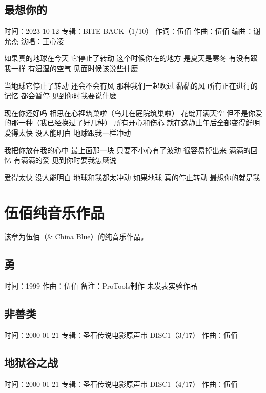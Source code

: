 \documentclass[UTF8,a4paper,oneside,twocolumn,12pt]{ctexbook}
\newcommand{\infopair}[2]{\textbullet #1：#2}
\newcommand{\zc}[1][伍佰]{\infopair{作词}{#1}}
\newcommand{\zq}[1][伍佰]{\infopair{作曲}{#1}}
\newcommand{\bq}[1][伍佰]{\infopair{编曲}{#1}}
\newcommand{\zj}[1]{\infopair{专辑}{#1}}
\newcommand{\sj}[1]{\infopair{时间}{#1}}
\newcommand{\bz}[1]{\infopair{备注}{#1}}
\newenvironment{info}{\begin{flushleft}\kaishu
	}
	{\end{flushleft}\normalsize\yahei\par}
\newenvironment{lyric}{
	}
{}
\begin{document}
\section{最想你的}
\begin{info}
	\sj{2023-10-12}
	\zj{BITE BACK（1/10）}
	\zc
	\zq
	\bq[谢允杰]
	\infopair{演唱}{王心凌}
\end{info}
\begin{lyric}%
	如果真的地球在今天 它停止了转动
	这个时候你在的地方 是夏天是寒冬
	有没有跟我一样 有湿湿的空气
	见面时候该说些什麽

	当地球它停止了转动 还会不会有风
	那种我们一起吹过 黏黏的风
	所有正在进行的记忆 都会暂停
	见到你时我要说什麽

	现在你还好吗 相思在心裡筑巢啦（鸟儿在庭院筑巢啦）
	花绽开满天空 但不是你爱的那一种（我已经换过了好几种）
	所有开心和伤心
	就在这静止午后全部变得鲜明
	爱得太快 没人能明白
	地球跟我一样冲动

	我把你放在我的心中 最上面那一块
	只要不小心有了波动 很容易掉出来
	满满的回忆 有满满的爱
	见到你时要我怎麽说

	爱得太快 没人能明白
	地球和我都太冲动
	如果地球 真的停止转动
	最想你的就是我
\end{lyric}

\chapter{伍佰纯音乐作品}
该章为伍佰（\& China Blue）的纯音乐作品。

\section{勇}%
\begin{info}
	\sj{1999}
	\zq
	\bz{ProTools制作 未发表实验作品}
\end{info}

\section{非善类}
\begin{info}
	\sj{2000-01-21}
	\zj{圣石传说电影原声带 DISC1（3/17）}
	\zq
\end{info}

\section{地狱谷之战}
\begin{info}
	\sj{2000-01-21}
	\zj{圣石传说电影原声带 DISC1（4/17）}
	\zq
\end{info}
\end{document}
